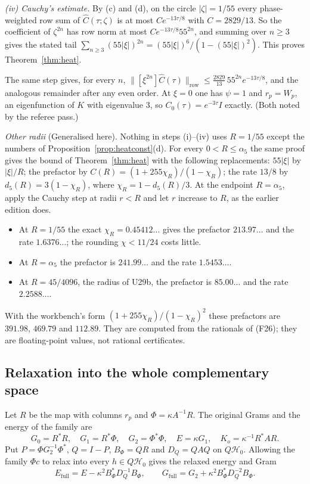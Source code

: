 \emph{(iv) Cauchy's estimate.} By (c) and (d), on the circle $|\zeta|=1/55$ every phase-weighted row sum of $\widehat C(\tau;\zeta)$ is at most $Ce^{-13\tau/8}$ with $C=2829/13$. So the coefficient of $\zeta^{2n}$ has row norm at most $C e^{-13\tau/8}55^{2n}$, and summing over $n\ge3$ gives the stated tail $\sum_{n\ge3}(55|\xi|)^{2n}=(55|\xi|)^6/(1-(55|\xi|)^2)$. This proves Theorem~\ref{thm:heat}.

The same step gives, for every $n$, $\|[\xi^{2n}]\widehat C(\tau)\|_{\mathrm{row}}\le\frac{2829}{13}\,55^{2n}e^{-13\tau/8}$, and the analogous remainder after any even order. At $\xi=0$ one has $\psi=1$ and $r_p=W_p$, an eigenfunction of $K$ with eigenvalue $3$, so $C_0(\tau)=e^{-3\tau}I$ exactly. (Both noted by the referee pass.)

\emph{Other radii} (\textsf{Generalised here}). Nothing in steps (i)--(iv) uses $R=1/55$ except the numbers of Proposition~\ref{prop:heatconst}(d). For every $0<R\le\alpha_5$ the same proof gives the bound of Theorem~\ref{thm:heat} with the following replacements: $55|\xi|$ by $|\xi|/R$; the prefactor by $C(R)=(1+255\chi_R)/(1-\chi_R)$; the rate $13/8$ by $d_5(R)=3(1-\chi_R)$, where $\chi_R=1-d_5(R)/3$. At the endpoint $R=\alpha_5$, apply the Cauchy step at radii $r<R$ and let $r$ increase to $R$, as the earlier edition does.
\begin{itemize}
\item At $R=1/55$ the exact $\chi_R=0.45412\ldots$ gives the prefactor $213.97\ldots$ and the rate $1.6376\ldots$; the rounding $\chi<11/24$ costs little.
\item At $R=\alpha_5$ the prefactor is $241.99\ldots$ and the rate $1.5453\ldots$.
\item At $R=45/4096$, the radius of U29b, the prefactor is $85.00\ldots$ and the rate $2.2588\ldots$.
\end{itemize}
With the workbench's form $(1+255\chi_R)/(1-\chi_R)^2$ these prefactors are $391.98$, $469.79$ and $112.89$. They are computed from the rationals of (F26); they are floating-point values, not rational certificates.

\subsection{Relaxation into the whole complementary space}\label{ssec:complement}

Let $R$ be the map with columns $r_p$ and $\Phi=\kappa A^{-1}R$. The original Grams and the energy of the family are
\[
G_0=R^*R,\quad G_1=R^*\Phi,\quad G_2=\Phi^*\Phi,\quad E=\kappa G_1,\quad K_o=\kappa^{-1}R^*AR.
\]
Put $P=\Phi G_2^{-1}\Phi^*$, $Q=I-P$, $B_\Phi=QR$ and $D_Q=QAQ$ on $Q\mathcal H_0$. Allowing the family $\Phi c$ to relax into every $h\in Q\mathcal H_0$ gives the relaxed energy and Gram
\[
E_{\mathrm{full}}=E-\kappa^2B_\Phi^*D_Q^{-1}B_\Phi,\qquad G_{\mathrm{full}}=G_2+\kappa^2B_\Phi^*D_Q^{-2}B_\Phi .
\]

